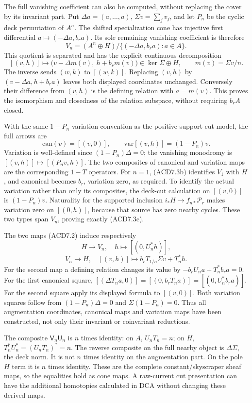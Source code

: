 The full vanishing coefficient can also be computed, without replacing
the cover by its invariant part. Put \(\Delta a=(a,\ldots,a)\),
\(\Sigma v=\sum_jv_j\), and let \(P_n\) be the cyclic deck permutation
of \(A^n\). The shifted specialization cone has injective first
differential \(a\mapsto(-\Delta a,b_ra)\). Its sole remaining vanishing
coefficient is therefore \[
V_n=(A^n\oplus H)/\{(-\Delta a,b_ra):a\in A\}.
\tag{ACD7.3a}
\] This quotient is separated and has the explicit continuous
decomposition \[
[(v,h)]\longmapsto
\bigl(v-\Delta m(v),\ h+b_rm(v)\bigr)
\in\ker\Sigma\oplus H,\qquad m(v)=\Sigma v/n.
\tag{ACD7.3b}
\] The inverse sends \((w,k)\) to \([(w,k)]\). Replacing \((v,h)\) by
\((v-\Delta a,h+b_ra)\) leaves both displayed coordinates unchanged.
Conversely their difference from \((v,h)\) is the defining relation with
\(a=m(v)\). This proves the isomorphism and closedness of the relation
subspace, without requiring \(b_rA\) closed.

With the same \(1-P_n\) variation convention as the positive-support cut
model, the full arrows are \[
\mathrm{can}(v)=[(v,0)],\qquad
\mathrm{var}[(v,h)]=(1-P_n)v.
\tag{ACD7.3c}
\] Variation is well-defined since \((1-P_n)\Delta=0\); the vanishing
monodromy is \([(v,h)]\mapsto[(P_nv,h)]\). The two composites of
canonical and variation maps are the corresponding \(1-T\) operators.
For \(n=1\), (ACD7.3b) identifies \(V_1\) with \(H\), and canonical
becomes \(b_r\), variation zero, as required. To identify the actual
variation rather than only its composites, the deck-cut calculation on
\([(v,0)]\) is \((1-P_n)v\). Naturality for the supported inclusion
\(i_*H\to f_{n*}\mathscr P_r\) makes variation zero on \([(0,h)]\),
because that source has zero nearby cycles. These two types span
\(V_n\), proving exactly (ACD7.3c).

The two maps (ACD7.2) induce respectively \[
H\longrightarrow V_n,\quad h\longmapsto[(0,U_n^*h)],
\] \[
V_n\longrightarrow H,\quad
[(v,h)]\longmapsto b_rT_{1/n}\Sigma v+T_n^*h.
\tag{ACD7.3d}
\] For the second map a defining relation changes its value by
\(-b_rU_na+T_n^*b_ra=0\). For the first canonical square,
\([(\Delta T_na,0)]=[(0,b_rT_na)]=[(0,U_n^*b_ra)]\). For the second
square apply its displayed formula to \([(v,0)]\). Both variation
squares follow from \((1-P_n)\Delta=0\) and \(\Sigma(1-P_n)=0\). Thus
all augmentation coordinates, canonical maps and variation maps have
been constructed, not only their invariant or coinvariant reductions.

The composite \(\mathsf V_n\mathsf U_n\) is \(n\) times identity: on
\(A\), \(U_nT_n=n\); on \(H\), \(T_n^*U_n^*=(U_nT_n)^*=n\). The reverse
composite on the full nearby object is \(\Delta\Sigma\), the deck norm.
It is not \(n\) times identity on the augmentation part. On the pole
\(H\) term it is \(n\) times identity. These are the complete
constant/skyscraper sheaf maps, so the equalities hold as cone maps. A
raw-current cut presentation can have the additional homotopies
calculated in DCA without changing these derived maps.

